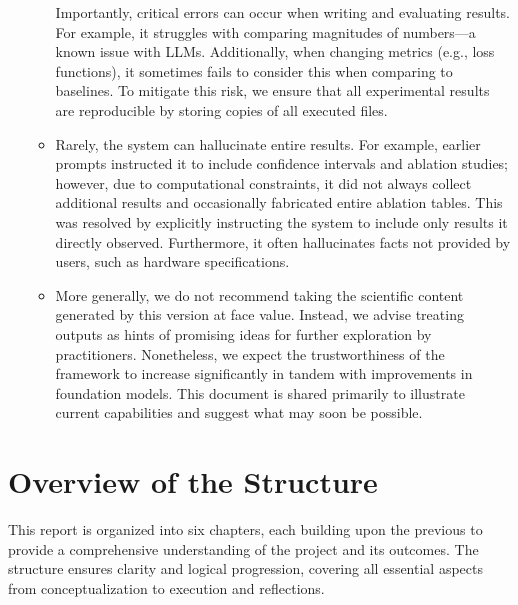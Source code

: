 \begin{enumerate}
\begin{itemize}
        Importantly, critical errors can occur when writing and evaluating results. For example, it struggles with comparing magnitudes of numbers—a known issue with LLMs. Additionally, when changing metrics (e.g., loss functions), it sometimes fails to consider this when comparing to baselines. To mitigate this risk, we ensure that all experimental results are reproducible by storing copies of all executed files.
        \item 

        Rarely, the system can hallucinate entire results. For example, earlier prompts instructed it to include confidence intervals and ablation studies; however, due to computational constraints, it did not always collect additional results and occasionally fabricated entire ablation tables. This was resolved by explicitly instructing the system to include only results it directly observed. Furthermore, it often hallucinates facts not provided by users, such as hardware specifications.
        \item 
        
        More generally, we do not recommend taking the scientific content generated by this version at face value. Instead, we advise treating outputs as hints of promising ideas for further exploration by practitioners. Nonetheless, we expect the trustworthiness of the framework to increase significantly in tandem with improvements in foundation models. This document is shared primarily to illustrate current capabilities and suggest what may soon be possible. 
    \end{itemize}
\end{enumerate}

\section{Overview of the Structure}
This report is organized into six chapters, each building upon the previous to provide a comprehensive understanding of the project and its outcomes. The structure ensures clarity and logical progression, covering all essential aspects from conceptualization to execution and reflections.

